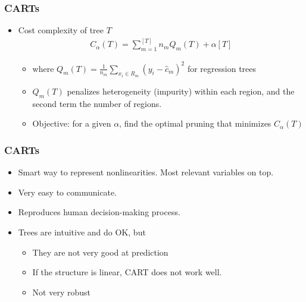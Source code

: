 \documentclass[
  shownotes,
  xcolor={svgnames},
  hyperref={colorlinks,citecolor=DarkBlue,linkcolor=DarkRed,urlcolor=DarkBlue}
  , aspectratio=169]{beamer}
\begin{document}
\begin{frame}[fragile]
\frametitle{CARTs}

\begin{itemize}
  \item Cost complexity of tree $T$
  \begin{align}
    C_{\alpha}(T)= \sum_{m=1}^{[T]} n_m Q_m (T) + \alpha [T]
  \end{align}

    \begin{itemize}
    \item where $Q_m (T)=\frac{1}{n_m} \sum_{x_i\in R_m} (y_i-\hat{c}_m)^2$ for regression trees
    \medskip
    \item  $Q_m (T)$ penalizes heterogeneity (impurity) within each region, and the second term the number of regions.
    \medskip
    \item  Objective: for a given $\alpha$, find the optimal pruning that minimizes $C_{\alpha}(T)$
    \end{itemize}
\end{itemize}
\end{frame}
\begin{frame}[fragile]
\frametitle{CARTs}

\begin{itemize}
  \item Smart way to represent nonlinearities. Most relevant variables on top.
  \medskip
  \item Very easy to communicate.
  \medskip
  \item  Reproduces human decision-making process.
  \medskip
  \item Trees are intuitive and do OK, but
  \begin{itemize}
    \item They are not very good at prediction 
    \item If the structure is linear, CART does not work well.
    \item  Not very robust
  \end{itemize}
  
\end{itemize}


\end{frame}
\end{document}
